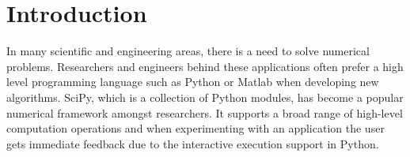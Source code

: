 \documentclass[10pt]{article}
\begin{document}




%
%
%




\section{Introduction}
In many scientific and engineering areas, there is a need to solve numerical problems. Researchers and engineers behind these applications often prefer a high level programming language such as Python\cite{Python} or Matlab when developing new algorithms. SciPy\cite{SciPy}, which is a collection of Python modules, has become a popular numerical framework amongst researchers. It supports a broad range of high-level computation operations and when experimenting with an application the user gets immediate feedback due to the interactive execution support in Python. 
\end{document}
